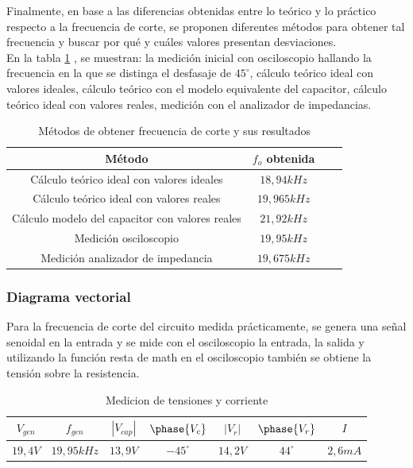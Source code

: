 
Finalmente, en base a las diferencias obtenidas entre lo te\'orico y lo pr\'actico respecto a la frecuencia de corte, se proponen diferentes m\'etodos para obtener tal frecuencia y buscar por qu\'e y cu\'ales valores presentan desviaciones. \\
En la tabla \ref{table:metodos}
, se muestran: la medici\'on inicial con osciloscopio hallando la frecuencia en la que se distinga el desfasaje de $45^{\circ}$, c\'alculo te\'orico ideal con valores ideales, c\'alculo te\'orico con el modelo equivalente del capacitor, c\'alculo te\'orico ideal con valores reales, medici\'on con el analizador de impedancias.

\begin{table}[H]
	\begin{center}
		\begin{tabular}{c c c c}
		M\'etodo & $f_o$ obtenida \\
		\hline
		C\'alculo te\'orico ideal con valores ideales & $18,94kHz$ \\
		C\'alculo te\'orico ideal con valores reales & $19,965kHz$ \\
		C\'alculo modelo del capacitor con valores reales & $21,92kHz$ \\
		Medici\'on osciloscopio & $19,95kHz$ \\
		Medici\'on analizador de impedancia & $19,675kHz$
		\end{tabular}
		\caption{M\'etodos de obtener frecuencia de corte y sus resultados}
		\label{table:metodos}	
	\end{center}
\end{table}

\subsubsection*{Diagrama vectorial}

Para la frecuencia de corte del circuito medida pr\'acticamente, se genera una se\~nal senoidal en la entrada y se mide con el osciloscopio la entrada, la salida y utilizando la función resta de math en el osciloscopio tambi\'en se obtiene la tensi\'on sobre la resistencia.

\begin{table}[H]
	\begin{center}
		\begin{tabular}{c c c c c c c}
		$V_{gen}$ & $f_{gen}$ & $|V_{cap}|$ & $\phase{V_c}$ & $|V_r|$ & $\phase{V_r}$ & $I$ \\
		\hline
		$19,4V$ & $19,95kHz$ & $13,9V$ & $-45^{\circ}$ & $14,2V$ & $44^{\circ}$ & $2,6mA$
		\end{tabular}
	\end{center}
	
	\caption{Medicion de tensiones y corriente}
\end{table}

